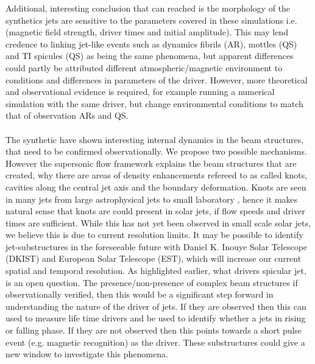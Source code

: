 \documentclass[12pt]{ociamthesis}
\newcommand{\np}{\\ \\}
\begin{document}
Additional, interesting conclusion that can reached is the morphology of the synthetics jets are sensitive to the parameters covered in these simulations i.e. (magnetic field strength, driver times and initial amplitude). This may lend credence to linking jet-like events such as dynamics fibrils (AR), mottles (QS) and TI spicules (QS) as being the same phenomena, but apparent differences could partly be attributed different atmospheric/magnetic environment to conditions and differences in parameters of the driver. However, more theoretical and observational evidence is required, for example running a numerical simulation with the same driver, but change environmental conditions to match that of observation ARs and QS. \np
%
The synthetic have shown interesting internal dynamics in the beam structures, that need to be confirmed observationally. We propose two possible mechanisms. However the supersonic flow framework explains the beam structures that are created, why there are areas of density enhancements refereed to as called knots, cavities along the central jet axis and the boundary deformation. Knots are seen in many jets from large astrophysical jets \citep{van_Putten_1996ApJ467L57V, DeGouveiaDalPino2005, Hada2013ApJ77570H, Cohen2014ApJ787151C, Hervet2017AnA606A103H} to small laboratory \citep{Menon2010, Edgington-Mitchell2014, Ono2014}, hence it makes natural sense that knots are could present in solar jets, if flow speeds and driver times are sufficient. While this has not yet been observed in small scale solar jets, we believe this is due to current resolution limits. It may be possible to identify jet-substructures in the foreseeable future with  Daniel K. Inouye Solar Telescope (DKIST) and European Solar Telescope (EST), which will increase our current spatial and temporal resolution. As highlighted earlier, what drivers spicular jet, is an open question. The presence/non-presence of complex beam structures if observationally verified, then this would be a significant step forward in understanding the nature of the driver of jets. If they are observed then this can used to measure life time drivers and be used to identify whether a jets in rising or falling phase. If they are not observed then this points towards a short pulse event (e.g. magnetic recognition) as the driver. These substructures could give a new window to investigate this phenomena.



\end{document}

